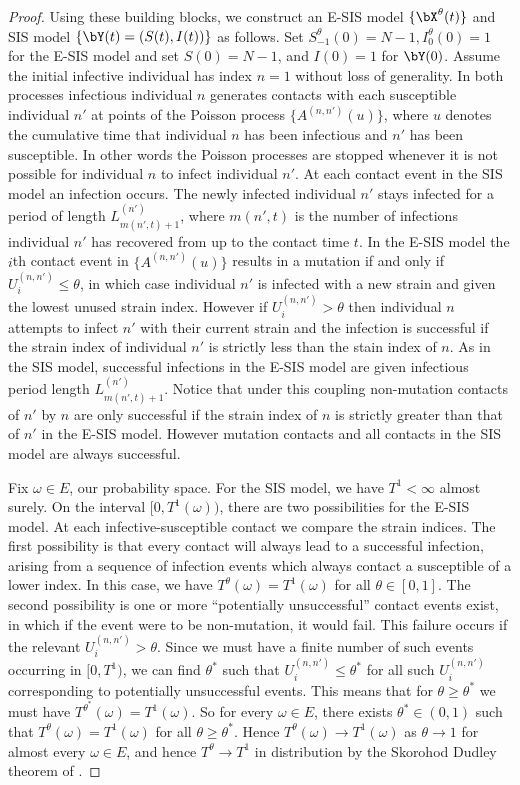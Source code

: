 \documentclass[smallextended]{svjour3}       %
\begin{document}
\begin{proof}
	Using these building blocks, we construct an E-SIS model $\{\bX^\theta(t)\}$ and SIS model $\{\bY(t) = (S(t), I(t))\}$ as follows. Set $S^\theta_{-1}(0) = N-1, I^\theta_0(0) = 1$ for the E-SIS model and set $S(0) = N-1$, and $I(0) = 1$ for $\bY(0)$. Assume the initial infective individual has index $n=1$ without loss of generality. In both processes infectious individual $n$ generates contacts with each susceptible individual $n'$ at points of the Poisson process $\{A^{(n,n')}(u)\}$, where $u$ denotes the cumulative time that individual $n$ has been infectious and $n'$ has been susceptible. In other words the Poisson processes are stopped whenever it is not possible for individual $n$ to infect individual $n'$. At each contact event in the SIS model an infection occurs. The newly infected individual $n'$ stays infected for a period of length $L^{(n')}_{m(n',t)+1}$, where $m(n',t)$ is the number of infections individual $n'$ has recovered from up to the contact time $t$. In the E-SIS model the $i$th contact event in $\{A^(n,n')(u)\}$ results in a mutation if and only if $U^{(n,n')}_i \leq \theta$, in which case individual $n'$ is infected with a new strain and given the lowest unused strain index. However if $U^{(n,n')}_i > \theta$ then individual $n$ attempts to infect $n'$ with their current strain and the infection is successful if the strain index of individual $n'$ is strictly less than the stain index of $n$. As in the SIS model, successful infections in the E-SIS model are given infectious period length $L^{(n')}_{m(n',t)+1}$. Notice that under this coupling non-mutation contacts of $n'$ by $n$ are only successful if the strain index of $n$ is strictly greater than that of $n'$ in the E-SIS model. However mutation contacts and all contacts in the SIS model are always successful.
 
	Fix $\omega \in E$, our probability space. For the SIS model, we have $T^1 < \infty$ almost surely. On the interval $[0, T^1(\omega))$, there are two possibilities for the E-SIS model. At each infective-susceptible contact we compare the strain indices. The first possibility is that every contact will always lead to a successful infection, arising from a sequence of infection events which always contact a susceptible of a lower index. In this case, we have $T^{\theta}(\omega) = T^1(\omega)$ for all $\theta \in [0,1]$. The second possibility is one or more  ``potentially unsuccessful'' contact events exist, in which if the event were to be non-mutation, it would fail. This failure occurs if the relevant $U^{(n,n')}_i > \theta$. Since we must have a finite number of such events occurring in $[0, T^1)$, we can find $\theta^*$ such that $U^{(n,n')}_i \leq \theta^*$ for all such $U^{(n,n')}_i$ corresponding to potentially unsuccessful events. This means that for $\theta\geq \theta^*$ we must have $T^{\theta^*}(\omega) = T^1(\omega)$. So for every $\omega \in E$, there exists $\theta^* \in (0,1)$ such that $T^{\theta}(\omega) = T^1(\omega)$ for all $\theta \geq \theta^*$. Hence $T^{\theta}(\omega) \rightarrow T^1(\omega)$ as $\theta \rightarrow 1$ for almost every $\omega \in E$, and hence $T^\theta\rightarrow T^1$ in distribution by the Skorohod Dudley theorem of \cite{dudley1968}.
\end{proof}
\end{document}
